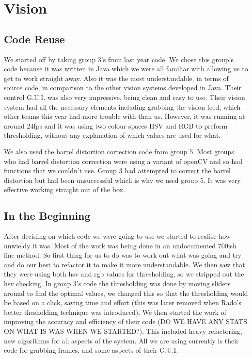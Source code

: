\section{Vision}

\subsection{Code Reuse}

We started off by taking group 3's from last year code.  We chose this group's code because it was written in Java which we were all familiar with allowing us to get to work straight away. Also it was the most understandable, in terms of source code, in comparison to the other vision systems developed in Java.  Their control G.U.I. was also very impressive, being clean and easy to use.  Their vision system had all the necessary elements including grabbing the vision feed, which other teams this year had more trouble with than us.  However, it was running at around 24fps and it was using two colour spaces HSV and RGB to preform thresholding, without any explanation of which values are used for what. 

We also used the barrel distortion correction code from group 5.  Most groups who had barrel distortion correction were using a variant of openCV and so had functions that we couldn't use.  Group 3 had attempted to correct the barrel distortion but had been unsuccessful which is why we used group 5.  It was very effective working straight out of the box.

\subsection{In the Beginning}

After deciding on which code we were going to use we started to realise how unwieldy it was.  Most of the work was being done in an undocumented 700ish line method.  So first thing for us to do was to work out what was going and try and do our best to refactor it to make it more understandable.  We then saw that they were using both hsv and rgb values for thresholding, so we stripped out the hsv checking.  In group 3's code the thresholding was done by moving sliders around to find the optimal values, we changed this so that the thresholding would be based on a click, saving time and effort (this was later removed when Rado's better thesholding technique was introduced).  We then started the work of improving the accuracy and efficiency of their code (DO WE HAVE ANY STATS ON WHAT IS WAS WHEN WE STARTED?).  This included heavy refactoring, new algorithms for all aspects of the system.  All we are using currently is their code for grabbing frames, and some aspects of their G.U.I.

